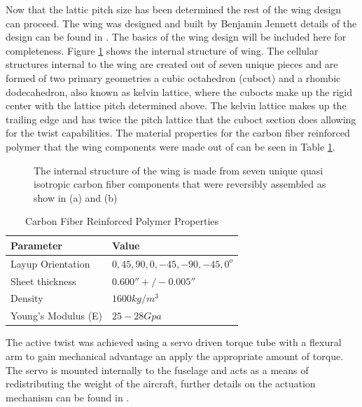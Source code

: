 \documentclass[11pt]{ucthesis}
\begin{document}
Now that the lattic pitch size has been determined the rest of the wing design can proceed. The wing was designed and built by Benjamin Jennett details of the design can be found in \cite{jenett2016digital}. The basics of the wing design will be included here for completeness. Figure \ref{fig:intStruct} shows the internal structure of wing. The cellular structures internal to the wing are created out of seven unique pieces and are formed of two primary geometries a cubic octahedron (cuboct) and a rhombic dodecahedron, also known as kelvin lattice, where the cubocts make up the rigid center with the lattice pitch determined above. The kelvin lattice makes up the trailing edge and has twice the pitch lattice that the cuboct section does allowing for the twist capabilities. The material properties for the carbon fiber reinforced polymer that the wing components were made out of can be seen in Table \ref{tab:cfrpProps}.

\begin{figure}
\hfill
{}
\hfill
{}
\hfill
\caption{The internal structure of the wing is made from seven unique quasi isotropic carbon fiber components that were reversibly assembled as show in (a) and (b)}
\label{fig:intStruct}
\end{figure}

\begin{table}[h]
\begin{center}
\caption{Carbon Fiber Reinforced Polymer Properties}
\label{tab:cfrpProps}
\begin{tabular}{  p{4cm} p{5cm}}
Parameter&Value\\\hline
Layup Orientation&$0,45,90,0,-45,-90,-45,0^{o}$\\
Sheet thickness&$0.600''+/-0.005''$\\
Density&$1600 kg/m^{3}$\\
Young's Modulus (E)&$25-28 Gpa$\\
\end{tabular}
\end{center}
\end{table}

The active twist was achieved using a servo driven torque tube with a flexural arm to gain mechanical advantage an apply the appropriate amount of torque. The servo is mounted internally to the fuselage and acts as a means of redistributing the weight of the aircraft, further details on the actuation mechanism can be found in \cite{jenett2016digital}.
\end{document}
